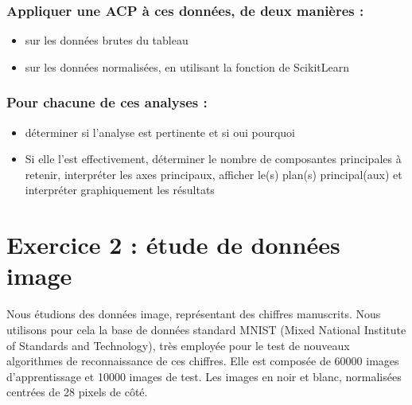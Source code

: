 \documentclass[letterpaper,10pt,french]{sphinxmanual}
\begin{document}
\subsection{Appliquer une ACP à ces données, de deux manières :}
\label{\detokenize{TP2_ACP:appliquer-une-acp-a-ces-donnees-de-deux-manieres}}\begin{itemize}
\item {} 
\sphinxAtStartPar
sur les données brutes du tableau

\item {} 
\sphinxAtStartPar
sur les données normalisées, en utilisant la fonction  de ScikitLearn

\end{itemize}


\subsection{Pour chacune de ces analyses :}
\label{\detokenize{TP2_ACP:pour-chacune-de-ces-analyses}}\begin{itemize}
\item {} 
\sphinxAtStartPar
déterminer si l’analyse est pertinente et si oui pourquoi

\item {} 
\sphinxAtStartPar
Si elle l’est effectivement, déterminer le nombre de composantes principales à retenir, interpréter les axes principaux, afficher le(s) plan(s) principal(aux) et interpréter graphiquement les résultats

\end{itemize}


\chapter{Exercice 2 : étude de données image}
\label{\detokenize{TP2_ACP:exercice-2-etude-de-donnees-image}}
\sphinxAtStartPar
Nous étudions des données image, représentant des chiffres manuscrits. Nous utilisons pour cela la base de données standard MNIST (Mixed National Institute of Standards and Technology), très employée pour le test de nouveaux algorithmes de reconnaissance de ces chiffres. Elle est composée de 60000 images d’apprentissage et 10000 images de test. Les images en noir et blanc, normalisées centrées de 28 pixels de côté.
\end{document}
